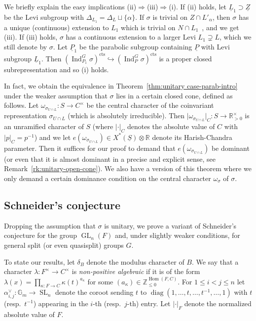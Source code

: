 \documentclass[a4paper]{amsart}
\numberwithin{equation}{section}
\theoremstyle{remark}
\theoremstyle{definition}
\DeclareMathOperator{\Ind}{Ind}
\DeclareMathOperator{\diag}{diag}
\DeclareMathOperator{\Hom}{Hom}
\newcommand{\Z}{\mathbb{Z}}
\newcommand{\R}{\mathbb{R}}
\DeclareMathOperator{\SL}{SL}
\DeclareMathOperator{\GL}{GL}
\newcommand{\alggrp}[1]{\underline{#1}}
\newcommand{\cts}{\mathrm{cts}}
\begin{document}
We briefly explain the easy implications (ii)$\Rightarrow$(iii)$\Rightarrow$(i).
If (ii) holds, let $\alggrp L_1 \supset \alggrp Z$ be the Levi subgroup with $\Delta_{L_1} = \Delta_L \sqcup \{\alpha\}$.
If $\sigma$ is trivial on $Z \cap L'_{\alpha}$, then $\sigma$ has a unique (continuous) extension to $L_1$ which is trivial on $N\cap L_1$~\cite[II.7 Proposition]{AHHV}, and we get (iii).
If (iii) holds, $\sigma$ has a continuous extension to a larger Levi $L_1 \supsetneq L$, which we still denote by $\sigma$.
Let $\alggrp P_1$ be the parabolic subgroup containing $\alggrp P$ with Levi subgroup $\alggrp L_1$.
Then $(\Ind_{P_1}^{G}\sigma)^{\cts}\hookrightarrow (\Ind_{P}^{G}\sigma)^{\cts}$ is a proper closed subrepresentation and so (i) holds.

In fact, we obtain the equivalence in Theorem~\ref{thm:unitary case-parab-intro} under the weaker assumption that $\sigma$ lies in a certain closed cone, defined as follows.
Let $\omega_{\sigma_{U \cap L}} \colon S \to C^\times$ be the central character of the coinvariant representation $\sigma_{U \cap L}$ (which is absolutely irreducible).
Then $\lvert\omega_{\sigma_{U \cap L}}\rvert_C \colon S \to \R^\times_{>0}$ is an unramified character of $S$ (where $\lvert\cdot\rvert_{C}$ denotes the absolute value of $C$ with $\lvert p\rvert_C = p^{-1}$) and we let $e(\omega_{\sigma_{U \cap L}}) \in X^*(\alggrp S) \otimes \R$ denote its Harish-Chandra parameter.
Then it suffices for our proof to demand that $e(\omega_{\sigma_{U \cap L}})$ be dominant (or even that it is almost dominant in a precise and explicit sense, see Remark~\ref{rk:unitary-open-cone}).
We also have a version of this theorem where we only demand a certain dominance condition on the central character $\omega_\sigma$ of $\sigma$.

\subsection{Schneider's conjecture}
\label{sec:schn-conj}

Dropping the assumption that $\sigma$ is unitary, we prove a variant of Schneider's conjecture for the group $\GL_n(F)$ and, under slightly weaker conditions, for general split (or even quasisplit) groups $G$.

To state our results, let $\delta_B$ denote the modulus character of $B$.
We say that a character $\lambda \colon F^\times \to C^\times$ is \emph{non-positive algebraic} if it is of the form $\lambda(x) = \prod_{\kappa\colon F\to C} \kappa(t)^{a_\kappa}$
for some $(a_\kappa) \in \Z_{\le 0}^{\Hom(F,C)}$.
For $1 \le i < j \le n$ let $\alpha_{i,j}^\vee \colon \mathbb G_m \to \SL_n$ denote the coroot sending $t$ to $\diag(1,\dots,t,\dots,t^{-1},\dots,1)$ with $t$ (resp.\ $t^{-1}$) appearing in the $i$-th (resp.\ $j$-th) entry.
Let $\lvert \cdot\rvert_F$ denote the normalized absolute value of $F$.
\end{document}
